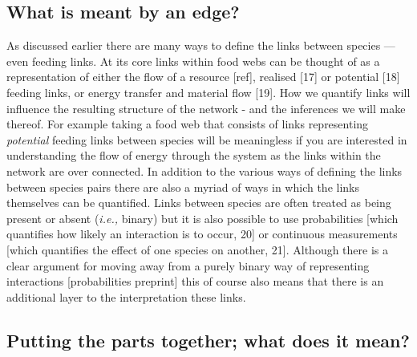 \documentclass[
]{article}
\begin{document}
\subsection{What is meant by an edge?}\label{what-is-meant-by-an-edge}

As discussed earlier there are many ways to define the links between
species --- even feeding links. At its core links within food webs can
be thought of as a representation of either the flow of a resource
{[}ref{]}, realised {[}17{]} or potential {[}18{]} feeding links, or
energy transfer and material flow {[}19{]}. How we quantify links will
influence the resulting structure of the network - and the inferences we
will make thereof. For example taking a food web that consists of links
representing \emph{potential} feeding links between species will be
meaningless if you are interested in understanding the flow of energy
through the system as the links within the network are over connected.
In addition to the various ways of defining the links between species
pairs there are also a myriad of ways in which the links themselves can
be quantified. Links between species are often treated as being present
or absent (\emph{i.e.,} binary) but it is also possible to use
probabilities {[}which quantifies how likely an interaction is to occur,
20{]} or continuous measurements {[}which quantifies the effect of one
species on another, 21{]}. Although there is a clear argument for moving
away from a purely binary way of representing interactions
{[}probabilities preprint{]} this of course also means that there is an
additional layer to the interpretation these links.

\subsection{Putting the parts together; what does it
mean?}\label{putting-the-parts-together-what-does-it-mean}
\end{document}

